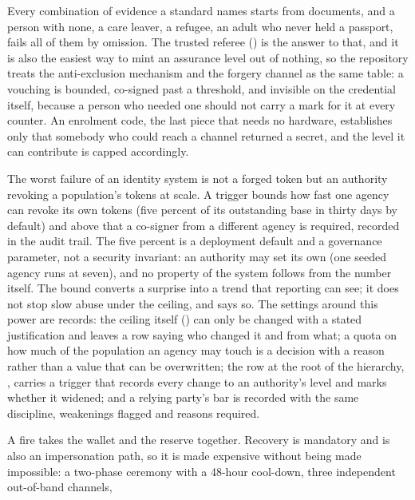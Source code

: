 \begin{description}
    Every combination of evidence a standard names starts from documents, and a person with none, a
    care leaver, a refugee, an adult who never held a passport, fails all of them by omission. The
    trusted referee () is the answer to that, and it is also the easiest way
    to mint an assurance level out of nothing, so the repository treats the anti-exclusion mechanism
    and the forgery channel as the same table: a vouching is bounded, co-signed past a threshold, and
    invisible on the credential itself, because a person who needed one should not carry a mark for
    it at every counter. An enrolment code, the last piece that needs no hardware, establishes only
    that somebody who could reach a channel returned a secret, and the level it can contribute is
    capped accordingly. \sImpl
  \item[Leaving: issuer discretion, as a decision that survives being changed.] The worst failure of
    an identity system is not a forged token but an authority revoking a population's tokens at
    scale. A trigger bounds how fast one agency can revoke its own tokens (five percent of its
    outstanding base in thirty days by default) and above that a co-signer from a different agency is
    required, recorded in the audit trail. The five percent is a deployment default and a governance
    parameter, not a security invariant: an authority may set its own (one seeded agency runs at
    seven), and no property of the system follows from the number itself. The bound converts a surprise into a trend that reporting
    can see; it does not stop slow abuse under the ceiling, and says so. The settings around this
    power are records: the ceiling itself () can
    only be changed with a stated justification and leaves a row saying who changed it and from what;
    a quota on how much of the population an agency may touch is a decision with a reason rather than
    a value that can be overwritten; the row at the root of the hierarchy, , carries a
    trigger that records every change to an authority's level and marks whether it widened; and a
    relying party's bar is recorded with the same discipline, weakenings flagged and reasons required. \sImpl
  \item[Returning: the recovery ceremony.] A fire takes the wallet and the reserve together. Recovery
    is mandatory and is also an impersonation path, so it is made expensive without being made
    impossible: a two-phase ceremony with a 48-hour cool-down, three independent out-of-band channels,

\end{description}
